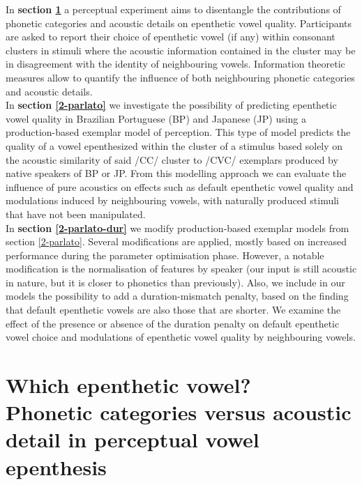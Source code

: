 In \textbf{section \ref{2-ahpa}} a perceptual experiment aims to disentangle the contributions of phonetic categories and acoustic details on epenthetic vowel quality. Participants are asked to report their choice of epenthetic vowel (if any) within consonant clusters in stimuli where the acoustic information contained in the cluster may be in disagreement with the identity of neighbouring vowels. Information theoretic measures allow to quantify the influence of both neighbouring phonetic categories and acoustic details.  \\

In \textbf{section \ref{2-parlato}} we investigate the possibility of predicting epenthetic vowel quality in Brazilian Portuguese (BP) and Japanese (JP) using a production-based exemplar model of perception. This type of model predicts the quality of a vowel epenthesized within the cluster of a stimulus based solely on the acoustic similarity of said /CC/ cluster to /CVC/ exemplars produced by native speakers of BP or JP. From this modelling approach we can evaluate the influence of pure acoustics on effects such as default epenthetic vowel quality and modulations induced by neighbouring vowels, with naturally produced stimuli that have not been manipulated. \\

In \textbf{section \ref{2-parlato-dur}} we modify production-based exemplar models from section \ref{2-parlato}. Several modifications are applied, mostly based on increased performance during the parameter optimisation phase. However, a notable modification is the normalisation of features by speaker (our input is still acoustic in nature, but it is closer to phonetics than previously). Also, we include in our models the possibility to add a duration-mismatch penalty, based on the finding that default epenthetic vowels are also those that are shorter. We examine the effect of the presence or absence of the duration penalty on default epenthetic vowel choice and modulations of epenthetic vowel quality by neighbouring vowels.   



\section{Which epenthetic vowel? \\ Phonetic categories versus acoustic detail in perceptual vowel epenthesis} \label{2-ahpa}

